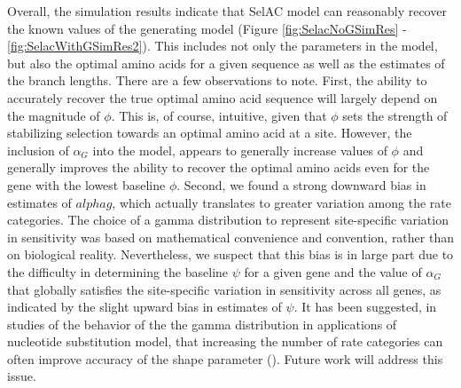 \documentclass{article}
\newcommand{\alphag}{\ensuremath{\alpha_G}\xspace}
\begin{document}
Overall, the simulation results indicate that SelAC model can reasonably recover the known values of the generating model (Figure \ref{fig:SelacNoGSimRes} - \ref{fig:SelacWithGSimRes2}).
This includes not only the parameters in the model, but also the optimal amino acids for a given sequence as well as the estimates of the branch lengths.
There are a few observations to note.
First, the ability to accurately recover the true optimal amino acid sequence will largely depend on the magnitude of $\phi$.
This is, of course, intuitive, given that $\phi$ sets the strength of stabilizing selection towards an optimal amino acid at a site.
However, the inclusion of $\alphag$ into the model, appears to generally increase values of $\phi$ and generally improves the ability to recover the optimal amino acids even for the gene with the lowest baseline $\phi$.
Second, we found a strong downward bias in estimates of $alphag$, which actually translates to greater variation among the rate categories. 
The choice of a gamma distribution to represent site-specific variation in sensitivity was based on mathematical convenience and convention, rather than on biological reality.
Nevertheless, we suspect that this bias is in large part due to the difficulty in determining the baseline $\psi$ for a given gene and the value of $\alphag$ that globally satisfies the site-specific variation in sensitivity across all genes, as indicated by the slight upward bias in estimates of $\psi$.
It has been suggested, in studies of the behavior of the the gamma distribution in applications of nucleotide substitution model, that increasing the number of rate categories can often improve accuracy of the shape parameter (\citet{MayroseEtAl2005}).
Future work will address this issue.
\end{document}
